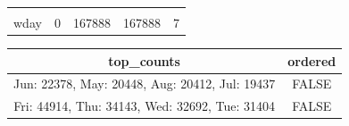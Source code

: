 \documentclass[]{book}
\theoremstyle{definition}
\theoremstyle{definition}
\theoremstyle{definition}
\theoremstyle{remark}
\begin{document}
\begin{longtable}[]{@{}ccccc@{}}
\begin{minipage}[t]{0.12\columnwidth}
\end{minipage}\tabularnewline
\begin{minipage}[t]{0.13\columnwidth}\centering\strut
wday\strut
\end{minipage} & \begin{minipage}[t]{0.12\columnwidth}\centering\strut
0\strut
\end{minipage} & \begin{minipage}[t]{0.13\columnwidth}\centering\strut
167888\strut
\end{minipage} & \begin{minipage}[t]{0.11\columnwidth}\centering\strut
167888\strut
\end{minipage} & \begin{minipage}[t]{0.12\columnwidth}\centering\strut
7\strut
\end{minipage}\tabularnewline
\bottomrule
\end{longtable}

\begin{longtable}[]{@{}cc@{}}
\toprule
\begin{minipage}[b]{0.41\columnwidth}\centering\strut
top\_counts\strut
\end{minipage} & \begin{minipage}[b]{0.12\columnwidth}\centering\strut
ordered\strut
\end{minipage}\tabularnewline
\midrule
\endhead
\begin{minipage}[t]{0.41\columnwidth}\centering\strut
Jun: 22378, May: 20448, Aug: 20412, Jul: 19437\strut
\end{minipage} & \begin{minipage}[t]{0.12\columnwidth}\centering\strut
FALSE\strut
\end{minipage}\tabularnewline
\begin{minipage}[t]{0.41\columnwidth}\centering\strut
Fri: 44914, Thu: 34143, Wed: 32692, Tue: 31404\strut
\end{minipage} & \begin{minipage}[t]{0.12\columnwidth}\centering\strut
FALSE\strut
\end{minipage}\tabularnewline
\bottomrule
\end{longtable}
\end{document}
